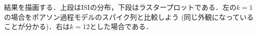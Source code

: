 結果を描画する．上段はISIの分布，下段はラスタープロットである．左の$k=1$の場合をポアソン過程モデルのスパイク列と比較しよう (同じ外観になっていることが分かる)．右は$k=12$とした場合である．
